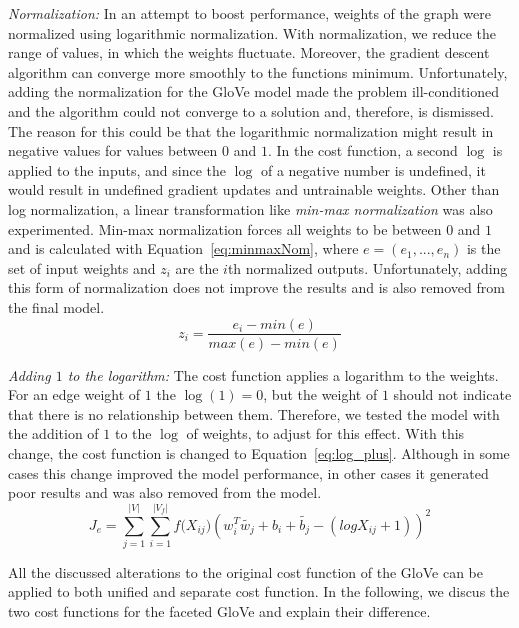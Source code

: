 \begin{compactitem}
\item \emph{Normalization:} In an attempt to boost performance, weights of the graph were normalized using logarithmic normalization. With normalization, we reduce the range of values, in which the weights fluctuate. Moreover, the gradient descent algorithm can converge more smoothly to the functions minimum. Unfortunately, adding the normalization for the GloVe model made the problem ill-conditioned and the algorithm could not converge to a solution and, therefore, is dismissed. The reason for this could be that the logarithmic normalization  might result in negative values for values between $0$ and $1$. In the cost function, a second $\log$ is applied to the inputs, and since the $\log$ of a negative number is undefined, it would result in undefined gradient updates and untrainable weights. Other than log normalization, a linear transformation like \emph{min-max normalization} was also experimented. Min-max normalization forces all weights to be between $0$ and $1$ and is calculated with Equation~\ref{eq:minmaxNom}, where $e=(e_1,...,e_n)$ is the set of input weights and $z_i$ are the $i$th normalized outputs. Unfortunately, adding this form of normalization does not improve the results and is also removed from the final model.
\begin{equation}
z_{ i }=\frac { e_{ i }-min(e) }{ max(e)-min(e) } 
\label{eq:minmaxNom}
\end{equation}

\item \emph{Adding $1$ to the logarithm:} The cost function applies a logarithm to the weights. For an edge weight of $1$ the $\log(1)=0$, but the weight of $1$ should not indicate that there is no relationship between them. Therefore, we tested the model with the addition of $1$ to the $\log$ of weights, to adjust for this effect. With this change, the cost function is changed to Equation~\ref{eq:log_plus}. Although in some cases this change improved the model performance, in other cases it generated poor results and was also removed from the model.
\begin{equation}
J_e=\sum _{ j=1 }^{ |V| }{}\sum _{ i=1 }^{ |V_f| }{ f({ X }_{ ij } } )(w_{ i }^{ T }\tilde{  w_{ j } } +b_{ i }+\tilde{  b_{ j } } -(log{ X }_{ ij }+1))^2
\label{eq:log_plus}
\end{equation}
\end{compactitem}
All the discussed alterations to the original cost function of the GloVe can be applied to both unified and separate cost function. In the following, we discus the two cost functions for the faceted GloVe and explain their difference. 

